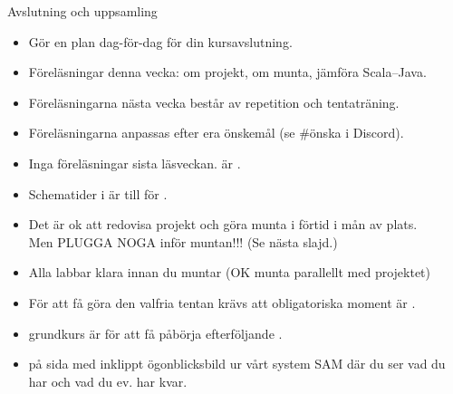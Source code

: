 \ifkompendium\else




\begin{SlideExtra}{Avslutning och uppsamling}

\begin{itemize}\SlideFontSmall

\item Gör en  plan dag-för-dag för din kursavslutning.

\item Föreläsningar denna vecka: om projekt, om munta, jämföra Scala--Java.

\item Föreläsningarna nästa vecka består av repetition och tentaträning.

\item Föreläsningarna anpassas efter era önskemål (se \#önska i Discord). %

\item Inga föreläsningar sista läsveckan.  är \LastLectureDate.

\item Schematider i  är till för .

\item Det är ok att redovisa projekt och göra munta i förtid i mån av plats. \\Men PLUGGA NOGA inför muntan!!! (Se nästa slajd.)

\item Alla labbar klara innan du muntar (OK munta parallellt med projektet)

\item För att få göra den valfria tentan krävs att  obligatoriska moment är . 

\item {} grundkurs är  för att få påbörja efterföljande .

\item {} på sida med inklippt ögonblicksbild ur vårt system SAM där du ser vad du har  och vad du ev. har kvar.

\end{itemize}

\end{SlideExtra}

